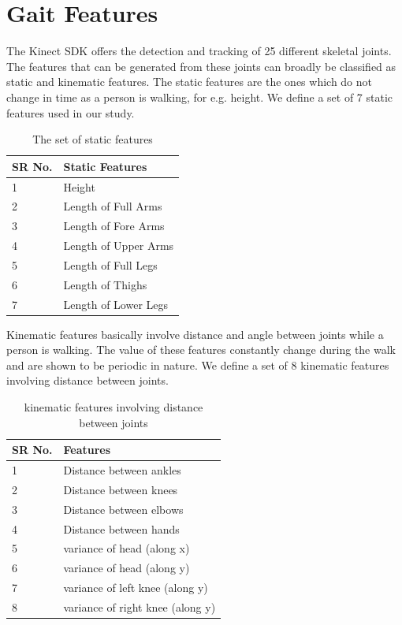 \section{Gait Features} \label{Gait Features } 
\noindent The Kinect SDK offers the detection and tracking of 25 different skeletal joints. The features that can be generated from these joints can broadly be classified as static and kinematic features.
The static features are the ones which do not change in time as a person is walking, for e.g. height. We define a set of 7 static features used in our study.
\def\arraystretch{1.3}
\begin{table}[h]
\centering
\begin{tabular}{| p{2cm} | |p{5cm}|}
 \hline
\cellcolor{pink} SR No. & \cellcolor{pink} Static Features  \\ \hline
1 & Height \\ \hline
2 & Length of Full Arms \\ \hline
3 & Length of Fore Arms \\\hline
4 & Length of Upper Arms \\ \hline
5 & Length of Full Legs \\ \hline
6 & Length of Thighs \\\hline
7 & Length of Lower Legs \\ \hline
\end{tabular}
\caption{The set of static features}
\end{table}

\noindent Kinematic features basically involve distance and angle between joints while a person is walking. The value of these features constantly change during the walk and are shown to be periodic in nature. We define a set of 8 kinematic features involving distance between joints.
\def\arraystretch{1.3}
\begin{table}
\centering
\begin{tabular}{| p{2cm} | |p{6cm}|}
 \hline
\cellcolor{pink} SR No. & \cellcolor{pink} Features  \\ \hline
1 & Distance between ankles \\ \hline
2 & Distance between knees \\ \hline
3 & Distance between elbows \\\hline
4 & Distance between hands \\ \hline
5 & variance of head (along x) \\ \hline
6 & variance of head (along y) \\\hline
7 & variance of left knee (along y) \\ \hline
8 & variance of right knee (along y) \\ \hline
\end{tabular}
\caption{ kinematic features involving distance between joints}
\end{table}


